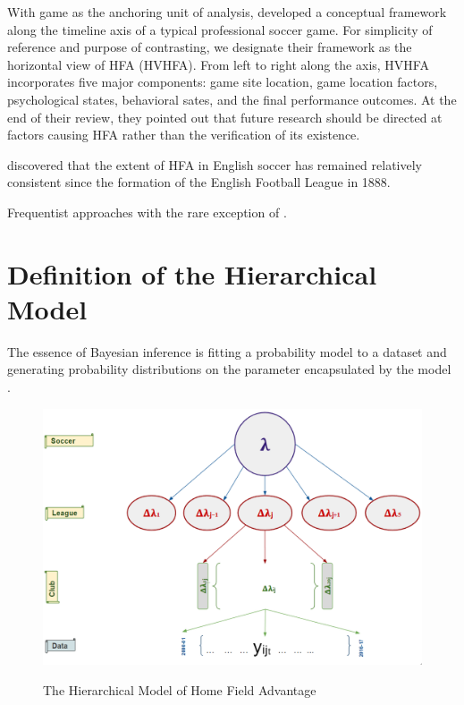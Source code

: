 \documentclass[USenglish]{article}
\begin{document}
With game as the anchoring unit of analysis, \cite{Courneya1992} developed a conceptual framework along the timeline axis of a typical professional soccer game. For simplicity of reference and purpose of contrasting, we designate their framework as the horizontal view of HFA (HVHFA). From left to right along the axis, HVHFA incorporates five major components: game site location, game location factors, psychological states, behavioral sates, and the final performance outcomes. At the end of their review, they pointed out that future research should be directed at factors causing HFA rather than the verification of its existence. 

\cite{Pollard1986} discovered that the extent of HFA in English soccer has remained relatively consistent since the formation of the English Football League in 1888. 

Frequentist approaches with the rare exception of \cite{Gajewski2006}.

 

\section{Definition of the Hierarchical Model} 

The essence of Bayesian inference is fitting a probability model to a dataset and generating probability distributions on the parameter encapsulated by the model \citep{Gelman2014}.

\begin{figure}
\caption{The Hierarchical Model of Home Field Advantage }
{\includegraphics[width=1.0\linewidth]{HFA_33}}
\label{fig33}
\end{figure} 
\end{document}
